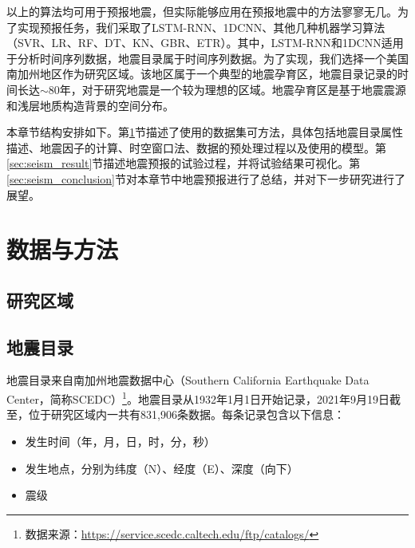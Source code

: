 以上的算法均可用于预报地震，但实际能够应用在预报地震中的方法寥寥无几。为了实现预报任务，我们采取了LSTM-RNN\citep{Wang2017Earthquake,Bhatia2018EARTHQUAKE,berhich2020lstm}、1DCNN、其他几种机器学习算法（SVR、LR、RF、DT、KN、GBR、ETR）。其中，LSTM-RNN和1DCNN适用于分析时间序列数据，地震目录属于时间序列数据\citep{Morales2010Pattern,Werner2009High}。为了实现，我们选择一个美国南加州地区作为研究区域。该地区属于一个典型的地震孕育区，地震目录记录的时间长达$\sim$80年，对于研究地震是一个较为理想的区域。地震孕育区是基于地震震源和浅层地质构造背景的空间分布。

本章节结构安排如下。第\ref{sec:seism_data_method}节描述了使用的数据集可方法，具体包括地震目录属性描述、地震因子的计算、时空窗口法、数据的预处理过程以及使用的模型。第\ref{sec:seism_result}节描述地震预报的试验过程，并将试验结果可视化。第\ref{sec:seism_conclusion}节对本章节中地震预报进行了总结，并对下一步研究进行了展望。

\section{数据与方法}\label{sec:seism_data_method}

\subsection{研究区域}\label{sec:seism_area}



\subsection{地震目录}\label{sec:seism_catolog}

地震目录来自南加州地震数据中心（Southern California Earthquake Data Center，简称SCEDC）\footnote{数据来源：\href{https://service.scedc.caltech.edu/ftp/catalogs/}{https://service.scedc.caltech.edu/ftp/catalogs/}}。地震目录从1932年1月1日开始记录，2021年9月19日截至，位于研究区域内一共有831,906条数据。每条记录包含以下信息：
\begin{itemize}
  \item[1] 发生时间（年，月，日，时，分，秒）
  \item[2] 发生地点，分别为纬度（N）、经度（E）、深度（向下）
  \item[3] 震级
\end{itemize}

